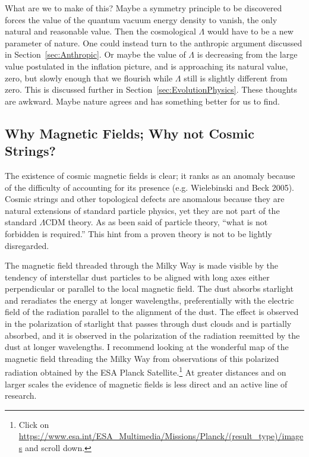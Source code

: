 \documentclass[fleqn,12pt]{article}
\begin{document}
What are we to make of this? Maybe a symmetry principle to be discovered forces the value of the quantum vacuum energy density to vanish, the only natural and reasonable value. Then the cosmological $\Lambda$ would have to be a new parameter of nature. One could instead turn to the anthropic argument discussed in Section~\ref{sec:Anthropic}. Or maybe the value of  $\Lambda$ is decreasing from the large value postulated in the inflation picture, and is approaching its natural value, zero, but slowly enough that we flourish while $\Lambda$ still is slightly different from zero. This is discussed further in Section~\ref{sec:EvolutionPhysics}. These thoughts are awkward. Maybe nature agrees and has something better for us to find.  

\subsection{Why Magnetic Fields; Why not Cosmic Strings?}

The existence of cosmic magnetic fields is clear; it ranks as an anomaly because of the difficulty of accounting for its presence (e.g. Wielebinski and Beck 2005). Cosmic strings and other topological defects are anomalous because they are natural extensions of standard particle physics, yet they are not part of the standard $\Lambda$CDM theory. As as been said of particle theory, ``what is not forbidden is required.'' This hint from a proven theory is not to be lightly disregarded. 

The magnetic field threaded through the Milky Way is made visible by the tendency of interstellar dust particles to be aligned with long axes either perpendicular or parallel to the local magnetic field. The dust absorbs starlight and reradiates the energy at longer wavelengths, preferentially with the electric field of the radiation parallel to the alignment of the dust. The effect is observed in the polarization of starlight that passes through dust clouds and is partially absorbed, and it is observed in the polarization of the radiation reemitted by the dust at longer wavelengths. I recommend looking at the wonderful map of the magnetic field threading the Milky Way from observations of this polarized radiation obtained by the ESA Planck Satellite.\footnote{Click on \url{https://www.esa.int/ESA_Multimedia/Missions/Planck/(result_type)/images} and scroll down.}  At greater distances and on larger scales the evidence of magnetic fields is less direct and an active line of research.
\end{document}
